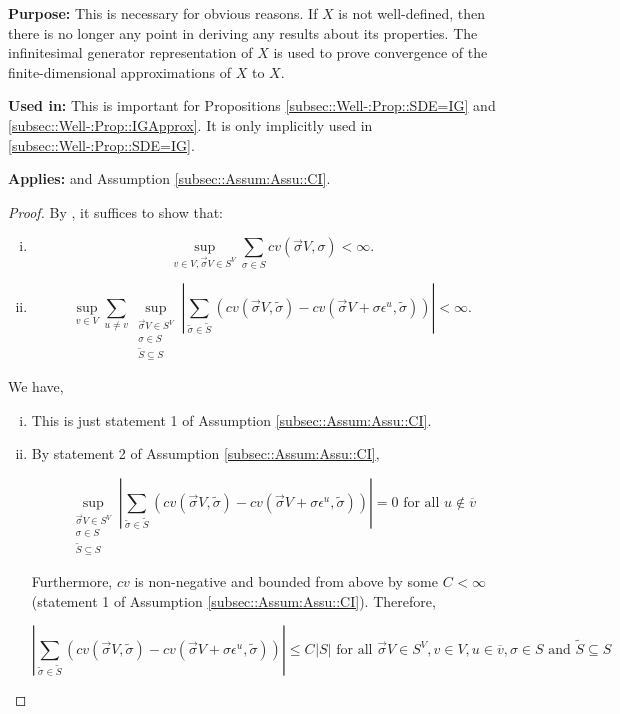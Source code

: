 \documentclass[12pt]{article}
\newcommand{\ov}{\overline}
\newcommand{\te}{\text}
\newcommand{\ep}{\epsilon}
\newcommand{\purpose}{\textbf{Purpose: }}
\newcommand{\usein}{\textbf{Used in: }}
\newcommand{\app}{\textbf{Applies: }}
\renewcommand{\v}{v}							%
\newcommand{\vv}{u}								%
\renewcommand{\S}{S}							%
\newcommand{\s}{\sigma}							%
\newcommand{\sv}{\vec{\s}}						%
\newcommand{\ev}[1]{\ep^{#1}}					%
\newcommand{\X}{X}								%
\newcommand{\IGr}{c}							%
\newcommand{\cl}{\ov}							%
\renewcommand{\ss}[1]{^{#1}}					%
\renewcommand{\SS}{\tilde{\S}}						%
\renewcommand{\ss}{\tilde{\s}}					%
\newcommand{\V}{V}									%
\newcommand{\XState}[1]{\S^{#1}}				%
\newcommand{\const}[1]{C_{#1}}						%
\begin{document}
\purpose This is necessary for obvious reasons. If \(\X{}{}\) is not well-defined, then there is no longer any point in deriving any results about its properties. The infinitesimal generator representation of \(\X{}{}\) is used to prove convergence of the finite-dimensional approximations of \(\X{}{}\) to \(\X{}{}\).

\usein This is important for Propositions \ref{subsec::Well-:Prop::SDE=IG} and \ref{subsec::Well-:Prop::IGApprox}. It is only implicitly used in \ref{subsec::Well-:Prop::SDE=IG}.

\app \cite[Theorem 3.9]{Lig85} and Assumption \ref{subsec::Assum:Assu::CI}.

\begin{proof}
By \cite[Theorem 3.9 (a) and (b)]{Lig85}, it suffices to show that:

\begin{enumerate}[i)]
\item 

\[\sup_{\v \in \V,\sv{}{\V} \in \S^\V} \sum_{\s \in \S} \IGr{\v}(\sv{}{\V},\s) < \infty.\]

\item 

\[\sup_{\v\in \V}\sum_{\vv\neq \v} \sup_{\substack{\sv{}{\V} \in \S^\V\\ \s\in \S\\ \SS \subseteq \S}} \left|\sum_{\ss \in \SS} (\IGr{\v}(\sv{}{\V},\ss) - \IGr{\v}(\sv{}{\V}+\s \ev{\vv},\ss))\right| < \infty.\]
\end{enumerate}

We have,

\begin{enumerate}[i)]
\item This is just statement 1 of Assumption \ref{subsec::Assum:Assu::CI}.

\item By statement 2 of Assumption \ref{subsec::Assum:Assu::CI}, 

\[\sup_{\substack{\sv{}{\V} \in \S^\V\\ \s\in \S\\ \SS\subseteq \S}} \left|\sum_{\ss \in \SS} (\IGr{\v}(\sv{}{\V},\ss) - \IGr{\v}(\sv{}{\V}+\s \ev{\vv},\ss))\right| = 0 \te{ for all } \vv \notin \cl{\v}\]

Furthermore, \(\IGr{\v}\) is non-negative and bounded from above by some \(\const{} < \infty\) (statement 1 of Assumption \ref{subsec::Assum:Assu::CI}). Therefore, 

\[\left|\sum_{\ss \in \SS} (\IGr{\v}(\sv{}{\V},\ss) - \IGr{\v}(\sv{}{\V}+\s\ev{\vv},\ss))\right| \leq \const{}|\S| \te{ for all } \sv{}{\V} \in \S^\V,\v \in \V, \vv \in \cl{\v}, \s \in \S \te{ and } \SS\subseteq \S\]


\end{enumerate}
\end{proof}
\end{document}
